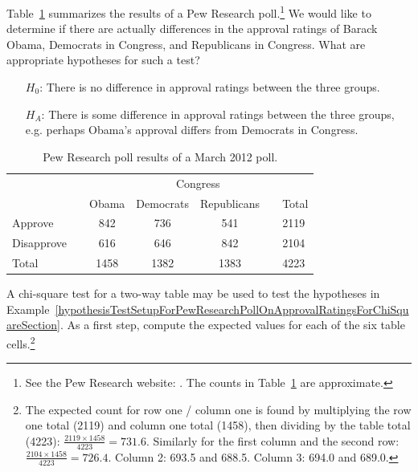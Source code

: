 \begin{example}{Table~\ref{pewResearchPollOnApprovalRatingsForChiSquareSectionExampleAndExercises} summarizes the results of a Pew Research poll.\footnote{See the Pew Research website: . The counts in Table~\ref{pewResearchPollOnApprovalRatingsForChiSquareSectionExampleAndExercises} are approximate.} We would like to determine if there are actually differences in the approval ratings of Barack Obama, Democrats in Congress, and Republicans in Congress. What are appropriate hypotheses for such a test?}\label{hypothesisTestSetupForPewResearchPollOnApprovalRatingsForChiSquareSection}
\begin{itemize}
\item[$H_0$:] There is no difference in approval ratings between the three groups.
\item[$H_A$:] There is some difference in approval ratings between the three groups, e.g. perhaps Obama's approval differs from Democrats in Congress.
\end{itemize}
\end{example}

\begin{table}
\centering
\begin{tabular}{ll ccc ll}
& & & \multicolumn{2}{c}{Congress} & \\
\cline{4-5}
 & \hspace{1mm} & Obama & Democrats & Republicans & \hspace{1mm} & Total \\
\hline
Approve				   & & 842    & 736 & 541   & 				& 2119 \\
Disapprove			   & & 616    & 646 & 842   &				& 2104 \\
\hline
Total					   & & 1458    & 1382 & 1383 & 				& 4223 \\
\hline
\end{tabular}
\caption{Pew Research poll results of a March 2012 poll.}
\label{pewResearchPollOnApprovalRatingsForChiSquareSectionExampleAndExercises}
\end{table}

\begin{exercise}
A chi-square test for a two-way table may be used to test the hypotheses in Example~\ref{hypothesisTestSetupForPewResearchPollOnApprovalRatingsForChiSquareSection}. As a first step, compute the expected values for each of the six table cells.\footnote{The expected count for row one / column one is found by multiplying the row one total (2119) and column one total (1458), then dividing by the table total (4223): $\frac{2119\times 1458}{4223} = 731.6$. Similarly for the first column and the second row: $\frac{2104\times 1458}{4223} = 726.4$. Column 2: 693.5 and 688.5. Column 3: 694.0 and 689.0.}
\end{exercise}

